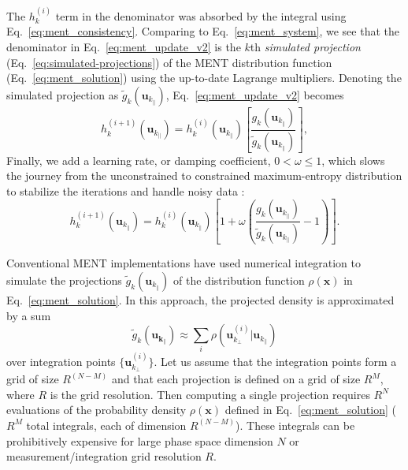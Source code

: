 \documentclass[%
    reprint,
    twocolumn,
    amsmath,
    amssymb,
    aps,
    prstab,
]{revtex4-2}
\begin{document}
%
The $h_k^{(i)}$ term in the denominator was absorbed by the integral using Eq.~\eqref{eq:ment_consistency}. Comparing to Eq.~\eqref{eq:ment_system}, we see that the denominator in Eq.~\eqref{eq:ment_update_v2} is the $k$th \textit{simulated projection} (Eq.~\eqref{eq:simulated-projections}) of the MENT distribution function (Eq.~\eqref{eq:ment_solution}) using the up-to-date Lagrange multipliers. Denoting the simulated projection as $\tilde{g}_k(\bm{u}_{k_\parallel})$, Eq.~\eqref{eq:ment_update_v2} becomes
%
\begin{equation}\label{ment_update_v3}
    h_k^{(i + 1)} ( \bm{u}_{k_\parallel} )
    =
    h_k^{(i    )} ( \bm{u}_{k_\parallel} )
    \left[
    \frac{
        {g}_k(\bm{u}_{k_\parallel})
    }
    {
       \tilde{g}_k(\bm{u}_{k_\parallel})
    }
    \right],
\end{equation}
%
Finally, we add a learning rate, or damping coefficient, $0 < \omega \le 1$, which slows the journey from the unconstrained to constrained maximum-entropy distribution to stabilize the iterations and handle noisy data \cite{Mottershead_1996}:
%
\begin{equation} \label{eq:ment_gauss_seidel}
    h_k^{(i + 1)}( \bm{u}_{k_\parallel} ) =
    h_k^{(i    )}( \bm{u}_{k_\parallel} )
    \left[
        1 + \omega
        \left(
            \frac{
                {g}_k(\bm{u}_{k_\parallel})
            }
            {
                \tilde{g}_k(\bm{u}_{k_\parallel})
            }
            - 1
        \right)
    \right].
\end{equation}
%

Conventional MENT implementations have used numerical integration to simulate the projections $\tilde{g}_k(\bm{u}_{k_\parallel})$ of the distribution function $\rho(\bm{x})$ in Eq.~\eqref{eq:ment_solution}. In this approach, the projected density is approximated by a sum
%
\begin{equation}
    \tilde{g}_k(\bm{u_{k_\parallel}}) 
    \approx
    \sum_{i}
    \rho(\bm{u}^{(i)}_{k_\perp} | \bm{u}_{k_\parallel})
\end{equation}
%
over integration points $\{ \bm{u}^{(i)}_{k_\perp} \}$. Let us assume that the integration points form a grid of size $R^{(N - M)}$ and that each projection is defined on a grid of size $R^M$, where $R$ is the grid resolution. Then computing a single projection requires $R^N$ evaluations of the probability density $\rho(\bm{x})$ defined in Eq.~\eqref{eq:ment_solution} ($R^M$ total integrals, each of dimension $R^{(N - M)}$). These integrals can be prohibitively expensive for large phase space dimension $N$ or measurement/integration grid resolution $R$.
\end{document}
